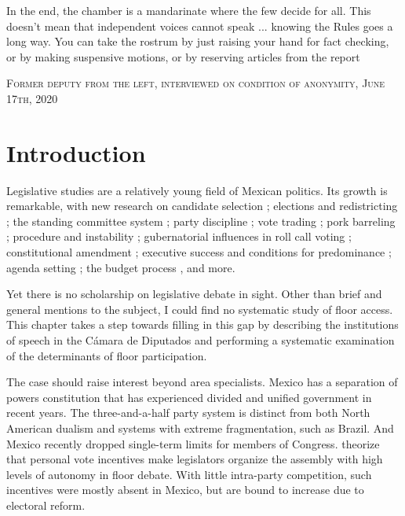 \documentclass[letter,12pt]{article}
\begin{document}
\newpage

\singlespacing
\epigraph{In the end, the chamber is a mandarinate where the few decide for all. This doesn't mean that independent voices cannot speak ... knowing the Rules goes a long way. You can take the rostrum by just raising your hand for fact checking, or by making suspensive motions, or by reserving articles from the report}%
{\textsc{Former deputy from the left, interviewed on condition of anonymity, June 17th, 2020}}
\doublespacing


\doublespacing

\section{Introduction} %

Legislative studies are a relatively young field of Mexican politics. Its growth is remarkable, with new research on candidate selection \citep{ascencio.kerevel.cand-sel-beh.2021}; elections and redistricting \citep{magar.altman.mcd.trelles2016pg}; the standing committee system \citep{bejar.Comisiones2009ed.book}; party discipline \citep{tellez-del-rio.2018}; vote trading \citep{lopez.lara.aldf2013}; pork barreling \citep{kerevelPork2015}; procedure and instability \citep{heller.weldon.2003}; gubernatorial influences in roll call voting \citep{rosas.langston.2011}; constitutional amendment \citep{casar.marvan2014book}; executive success \citep{bejarQuienLegisla2012} and conditions for predominance \citep{weldon.1997}; agenda setting \citep{casar.agsetting.2016}; the budget process \citep{weldon.2002}, and more.

Yet there is no scholarship on legislative debate in sight. Other than brief and general mentions to the subject, I could find no systematic study of floor access. This chapter takes a step towards filling in this gap by describing the institutions of speech in the Cámara de Diputados and performing a systematic examination of the determinants of floor participation.

The case should raise interest beyond area specialists. Mexico has a separation of powers constitution that has experienced divided and unified government in recent years. The three-and-a-half party system is distinct from both North American dualism and systems with extreme fragmentation, such as Brazil. And Mexico recently dropped single-term limits for members of Congress. \citet{proksch-slapin2015book} theorize that personal vote incentives make legislators organize the assembly with high levels of autonomy in floor debate. With little intra-party competition, such incentives were mostly absent in Mexico, but are bound to increase due to electoral reform. 
\end{document}
